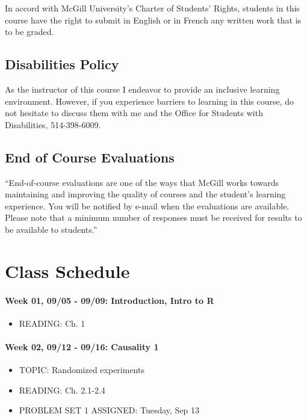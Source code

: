 \documentclass[11pt,]{article}
\begin{document}
In accord with McGill University's Charter of Students' Rights, students
in this course have the right to submit in English or in French any
written work that is to be graded.

\subsection{Disabilities Policy}\label{disabilities-policy}

As the instructor of this course I endeavor to provide an inclusive
learning environment. However, if you experience barriers to learning in
this course, do not hesitate to discuss them with me and the Office for
Students with Disabilities, 514-398-6009.

\subsection{End of Course Evaluations}\label{end-of-course-evaluations}

``End-of-course evaluations are one of the ways that McGill works
towards maintaining and improving the quality of courses and the
student's learning experience. You will be notified by e-mail when the
evaluations are available. Please note that a minimum number of
responses must be received for results to be available to students.''
\newpage

\section{Class Schedule}\label{class-schedule}

\paragraph{Week 01, 09/05 - 09/09: Introduction, Intro to
R}\label{week-01-0905---0909-introduction-intro-to-r}

\begin{itemize}
\itemsep1pt\parskip0pt
\item
  READING: Ch. 1
\end{itemize}

\paragraph{Week 02, 09/12 - 09/16: Causality
1}\label{week-02-0912---0916-causality-1}

\begin{itemize}
\itemsep1pt\parskip0pt
\item
  TOPIC: Randomized experiments
\item
  READING: Ch. 2.1-2.4
\item
  PROBLEM SET 1 ASSIGNED: Tuesday, Sep 13
\end{itemize}
\end{document}

